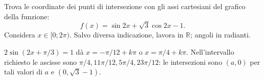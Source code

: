 
\begin{esercizio}
Trova le coordinate dei punti di intersezione con gli assi
cartesiani del grafico della funzione: 
\[
f(x)=\sin 2x+\sqrt{3}\cos 2x-1.
\]
Considera $x\in[0;2\pi)$.
Salvo diversa indicazione, lavora in $\mathbb R$; angoli in radianti.
\end{esercizio}

\begin{soluzione}
$2\sin(2x+\pi/3)=1$ dà $x=-\pi/12+k\pi$ o $x=\pi/4+k\pi$.
Nell'intervallo richiesto le ascisse sono $\pi/4,11\pi/12,5\pi/4,23\pi/12$:
le intersezioni sono $(a,0)$ per tali valori di $a$ e $(0,\sqrt3-1)$.
\end{soluzione}
